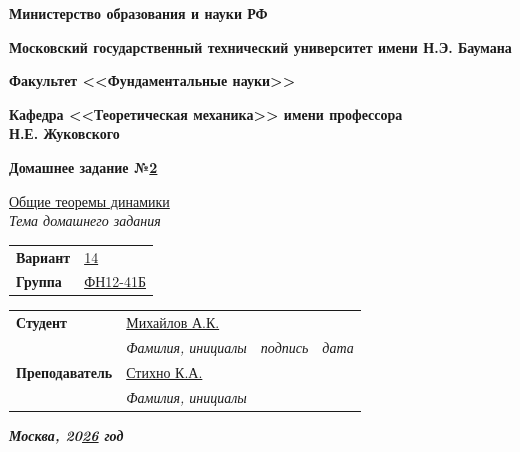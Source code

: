 \documentclass{article}
\begin{document}
\fontsize{14}{16}\selectfont

\begin{titlepage}
	\begin{flushleft}
		{\Large\textbf{Министерство образования и науки РФ}}
		
		\vspace{1cm}
		
		{\Large\textbf{Московский государственный технический университет имени Н.Э. Баумана}}
		
		\vspace{1cm}
		
		{\Large\textbf{Факультет <<Фундаментальные науки>>}}
		
		\vspace{1cm}
		
		{\Large\textbf{Кафедра <<Теоретическая механика>> имени профессора\\Н.Е. Жуковского}}
		
		\vspace{3cm}
		
		\textbf{\Large Домашнее задание №\underline{2}}
		
		\vspace{0.4cm}
		
		\underline{Общие теоремы динамики}\\[-1mm]
		
		{\normalsize \textit{Тема домашнего задания}}
		
		\vspace{1cm}
		
		\begin{tabular}{@{} p{2cm} p{3cm} @{}}
			\textbf{Вариант} & \underline{14} \tabularnewline[4mm]
			\textbf{Группа} & \underline{ФН12-41Б}
		\end{tabular}
		
		\vspace{2cm}
		
		\begin{tabular}{@{} p{3.8cm} p{5.4cm} p{2.5cm} p{3cm} @{}}
			\textbf{Студент} & \underline{Михайлов А.К.} & \hrulefill & \hrulefill \\[-1mm]
			
			& {\normalsize \textit{Фамилия, инициалы}} & {\normalsize \textit{подпись}} & {\normalsize \textit{дата}} \tabularnewline[6mm]
			
			\textbf{Преподаватель} & \underline{Стихно К.А.} & & \\[-1mm]
			
			& {\normalsize \textit{Фамилия, инициалы}} & &
		\end{tabular}
		
		\vfill
		
		\textbf{\textit{Москва, 20\underline{26} год}}
	\end{flushleft}
\end{titlepage}
\end{document}
